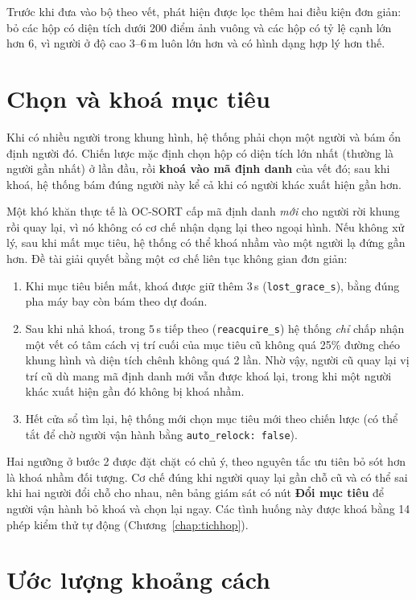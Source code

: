 Trước khi đưa vào bộ theo vết, phát hiện được lọc thêm hai điều kiện đơn giản: bỏ các hộp có diện tích dưới 200 điểm ảnh vuông và các hộp có tỷ lệ cạnh lớn hơn 6, vì người ở độ cao 3--6\,m luôn lớn hơn và có hình dạng hợp lý hơn thế.

\section{Chọn và khoá mục tiêu}

Khi có nhiều người trong khung hình, hệ thống phải chọn một người và bám ổn định người đó. Chiến lược mặc định chọn hộp có diện tích lớn nhất (thường là người gần nhất) ở lần đầu, rồi \textbf{khoá vào mã định danh} của vết đó; sau khi khoá, hệ thống bám đúng người này kể cả khi có người khác xuất hiện gần hơn.

Một khó khăn thực tế là OC-SORT cấp mã định danh \textit{mới} cho người rời khung rồi quay lại, vì nó không có cơ chế nhận dạng lại theo ngoại hình. Nếu không xử lý, sau khi mất mục tiêu, hệ thống có thể khoá nhầm vào một người lạ đứng gần hơn. Đề tài giải quyết bằng một cơ chế liên tục không gian đơn giản:
\begin{enumerate}
\item Khi mục tiêu biến mất, khoá được giữ thêm $3$\,s (\texttt{lost\_grace\_s}), bằng đúng pha máy bay còn bám theo dự đoán.
\item Sau khi nhả khoá, trong $5$\,s tiếp theo (\texttt{reacquire\_s}) hệ thống \textit{chỉ} chấp nhận một vết có tâm cách vị trí cuối của mục tiêu cũ không quá 25\% đường chéo khung hình và diện tích chênh không quá 2 lần. Nhờ vậy, người cũ quay lại vị trí cũ dù mang mã định danh mới vẫn được khoá lại, trong khi một người khác xuất hiện gần đó không bị khoá nhầm.
\item Hết cửa sổ tìm lại, hệ thống mới chọn mục tiêu mới theo chiến lược (có thể tắt để chờ người vận hành bằng \texttt{auto\_relock: false}).
\end{enumerate}
Hai ngưỡng ở bước 2 được đặt chặt có chủ ý, theo nguyên tắc ưu tiên bỏ sót hơn là khoá nhầm đối tượng. Cơ chế đúng khi người quay lại gần chỗ cũ và có thể sai khi hai người đổi chỗ cho nhau, nên bảng giám sát có nút \textbf{Đổi mục tiêu} để người vận hành bỏ khoá và chọn lại ngay. Các tình huống này được khoá bằng 14 phép kiểm thử tự động (Chương~\ref{chap:tichhop}).

\section{Ước lượng khoảng cách}

